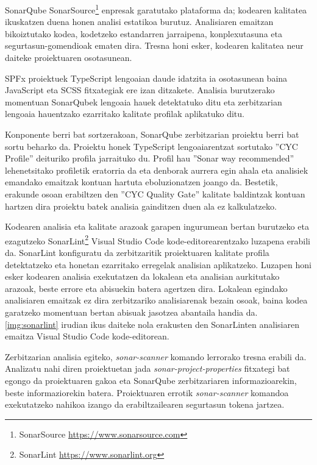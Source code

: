 SonarQube SonarSource\footnote{SonarSource \url{https://www.sonarsource.com}} enpresak garatutako plataforma da; kodearen kalitatea ikuskatzen duena honen analisi estatikoa burutuz. Analisiaren emaitzan bikoiztutako kodea, kodetzeko estandarren jarraipena, konplexutasuna eta segurtasun-gomendioak ematen dira. Tresna honi esker, kodearen kalitatea neur daiteke proiektuaren osotasunean. 

SPFx proiektuek TypeScript lengoaian daude idatzita ia osotasunean baina JavaScript eta SCSS fitxategiak ere izan ditzakete. Analisia burutzerako momentuan
SonarQubek lengoaia hauek detektatuko ditu eta zerbitzarian lengoaia hauentzako ezarritako kalitate profilak aplikatuko ditu.

Konponente berri bat sortzerakoan, SonarQube zerbitzarian proiektu berri bat sortu beharko da.
Proiektu honek TypeScript lengoaiarentzat sortutako ''CYC Profile'' deituriko profila jarraituko du.
Profil hau ''Sonar way recommended'' lehenetsitako profiletik eratorria da eta denborak aurrera egin ahala eta analisiek emandako emaitzak kontuan hartuta eboluzionatzen joango da.
Bestetik, erakunde osoan erabiltzen den ''CYC Quality Gate'' kalitate baldintzak kontuan hartzen dira proiektu batek analisia gainditzen duen ala ez kalkulatzeko.

Kodearen analisia eta kalitate arazoak garapen ingurumean bertan burutzeko eta ezagutzeko SonarLint\footnote{SonarLint \url{https://www.sonarlint.org}} Visual Studio Code kode-editorearentzako luzapena erabili da.
SonarLint konfiguratu da zerbitzaritik proiektuaren kalitate profila detektatzeko eta honetan ezarritako erregelak analisian aplikatzeko.
Luzapen honi esker kodearen analisia exekutatzen da lokalean eta analisian aurkitutako arazoak, beste errore eta abisuekin batera agertzen dira.
Lokalean egindako analisiaren emaitzak ez dira zerbitzariko analisiarenak bezain osoak, baina kodea garatzeko momentuan bertan abisuak jasotzea abantaila handia da. \ref{img:sonarlint} irudian ikus daiteke nola erakusten den SonarLinten analisiaren emaitza Visual Studio Code kode-editorean. 

Zerbitzarian analisia egiteko, \textit{sonar-scanner} komando lerrorako tresna erabili da.
Analizatu nahi diren proiektuetan jada \textit{sonar-project-properties} fitxategi bat egongo da proiektuaren gakoa eta SonarQube zerbitzariaren informazioarekin, beste informaziorekin batera.
Proiektuaren errotik \textit{sonar-scanner} komandoa exekutatzeko nahikoa izango da erabiltzailearen segurtasun tokena jartzea. 

